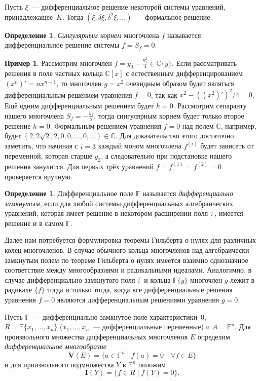 \documentclass[16pt]{article}
\theoremstyle{plain1}
\theoremstyle{plain2}
\theoremstyle{plain}
\theoremstyle{plain3}
\theoremstyle{definition}
\newtheorem{definition}[theorem2]{Определение}
\newtheorem*{example*}{Пример}
\theoremstyle{remark}
\begin{document}
Пусть $\xi$~--- дифференциальное решение некоторой системы уравнений, принадлежащее~$K$.
Тогда $(\xi, \delta \xi, \delta^2 \xi, \ldots)$~--- формальное решение.

\begin{definition} \emph{Сингулярным корнем} многочлена $f$
называется дифференциальное решение системы $f=S_f=0$.
\end{definition}
\begin{example*}
Рассмотрим многочлен $f=y_0-\frac{y^2_1}{4}\in\mathbb{C}\{y\}$. Если рассматривать решения в поле частных кольца $\mathbb{C}[x]$ с естественным дифференцированием $(x^n)'=nx^{n-1}$, то многочлен $g=x^2$ очевидным образом будет являться  дифференциальным решением уравнения $f=0$, так как $x^2-((x^2)')^2/4=0$. Ещё одним дифференциальным решением будет $h=0$. Рассмотрим сепаранту нашего многочлена $S_f=-\frac{y_1}{2}$, тогда сингулярным корнем будет только второе решение $h=0$. Формальным решением уравнения $f=0$ над полем $\mathbb{C}$, например, будет $(2,2\sqrt{2},2,0,0,\ldots,0,\ldots)\in \mathbb{C}$. Для доказательство этого достаточно заметить, что начиная с $i=3$ каждый моном  многочлена $f^{(i)}$ будет зависеть от переменной, которая старше $y_2$, а следовательно при подстановке нашего решения занулится. Для первых трёх уравнений $f=f^{(1)}=f^{(2)}=0$ проверяется вручную.
\end{example*}
\begin{definition} Дифференциальное поле $\mathbb{F}$ называется
\emph{дифференциально замкнутым}, если для любой системы дифференциальных алгебраических
уравнений, которая имеет решение в некотором расширении поля $\mathbb{F}$,
имеется решение и в самом $\mathbb{F}$.
\end{definition}

Далее нам потребуется формулировка теоремы Гильберта о нулях для
различных колец многочленов.
В случае обычного кольца многочленов над алгебраически
замкнутым полем по теореме Гильберта о нулях
имеется взаимно однозначное соответствие между многообразиями и радикальными идеалами.
Аналогично, в случае дифференциально
замкнутого поля $\mathbb{F}$ и кольца $\mathbb{F}\{y\}$ многочлен $g$ лежит в
радикале $\{f\}$ тогда и только тогда, когда все дифференциальные
решения уравнения $f=0$ являются дифференциальным решениями уравнения $g=0$.

Пусть $\mathbb{F}$~--- дифференциально замкнутое поле характеристики~$0$,
$R=\mathbb{F}\{x_1,...,x_n\}$ ($x_1,...,x_n$~--- дифференциальные
переменные) и $A=\mathbb{F}^n$. Для произвольного множества
дифференциальных многочленов $E$ определим \emph{дифференциальное многообразие}
$$
\mathbf{V}(E)=\{a\in \mathbb{F}^n \mid f(a)=0\quad\forall  f\in E\}
$$
и для произвольного подмножества $Y$ в $\mathbb{F}^n$ положим
$$
\mathbf{I}(Y)=\{f \in R \mid f(Y)=0\}.
$$
\end{document}
